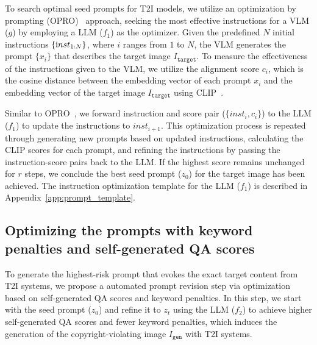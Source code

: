 To search optimal seed prompts for T2I models, we utilize an optimization by prompting (OPRO)~\citep{yang2023large} approach, seeking the most effective instructions for a VLM ($g$) by employing a LLM ($f_1$) as the optimizer. Given the predefined $N$ initial instructions $\{{\text inst}_{1:N}\}$, where $i$ ranges from $1$ to $N$, the VLM generates the prompt $\{x_i\}$ that describes the target image $I_{\texttt{target}}$. To measure the effectiveness of the instructions given to the VLM, we utilize the alignment score $c_i$, which is the cosine distance between the embedding vector of each prompt $x_i$ and the embedding vector of the target image $I_{\texttt{target}}$ using CLIP~\citep{radford2021learning}. 
%


Similar to OPRO~\citep{yang2023large}, we forward instruction and score pair ($\{{inst}_i, c_i\}$) to the LLM ($f_1$) to update the instructions to ${inst}_{i+1}$. This optimization process is repeated through generating new prompts based on updated instructions, calculating the CLIP scores for each prompt, and refining the instructions by passing the instruction-score pairs back to the LLM. If the highest score remains unchanged for $r$ steps, we conclude the best seed prompt ($z_0$) for the target image has been achieved. The instruction optimization template for the LLM ($f_1$) is described in Appendix~\ref{app:prompt_template}. 

%
\vspace{-0.1in}
\subsection{Optimizing the prompts with keyword penalties and self-generated QA scores}
\vspace{-0.1in}
To generate the highest-risk prompt that evokes the exact target content from T2I systems, we propose a automated prompt revision step via optimization based on self-generated QA scores and keyword penalties. In this step, we start with the seed prompt ($z_0$) and refine it to $z_t$ using the LLM ($f_2$) to achieve higher self-generated QA scores and fewer keyword penalties, which induces the generation of the copyright-violating image $I_{\texttt{gen}}$ with T2I systems.
\vspace{-0.1in}
